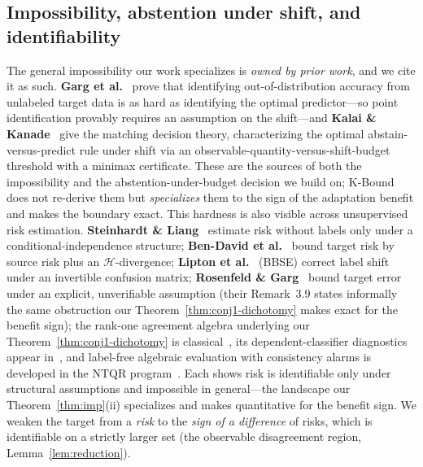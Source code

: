 \documentclass[conference]{IEEEtran}
\theoremstyle{plain}
\theoremstyle{definition}
\begin{document}
\subsection{Impossibility, abstention under shift, and identifiability}
The general impossibility our work specializes is \emph{owned by prior work}, and we cite it as
such. \textbf{Garg et al.}~\cite{garg2022atc} prove that identifying out-of-distribution accuracy
from unlabeled target data is as hard as identifying the optimal predictor---so point
identification provably requires an assumption on the shift---and \textbf{Kalai \&
Kanade}~\cite{kalai2021abstain} give the matching decision theory, characterizing the optimal
abstain-versus-predict rule under shift via an observable-quantity-versus-shift-budget threshold
with a minimax certificate. These are the sources of both the impossibility and the
abstention-under-budget decision we build on; K-Bound does not re-derive them but
\emph{specializes} them to the sign of the adaptation benefit and makes the boundary exact.
This hardness is also visible across unsupervised risk estimation.
\textbf{Steinhardt \& Liang}~\cite{steinhardt2016} estimate risk without labels only under a conditional-independence
structure; \textbf{Ben-David et al.}~\cite{bendavid2010theory,bendavid2010impossibility} bound target risk by source risk plus an
$\mathcal{H}$-divergence; \textbf{Lipton et al.}~\cite{lipton2018bbse} (BBSE) correct label shift under an invertible
confusion matrix; \textbf{Rosenfeld \& Garg}~\cite{rosenfeld2023dis2} bound target error under an explicit,
unverifiable assumption (their Remark~3.9 states informally the same obstruction our
Theorem~\ref{thm:conj1-dichotomy} makes exact for the benefit sign); the rank-one agreement algebra underlying our
Theorem~\ref{thm:conj1-dichotomy} is classical~\cite{parisi2014,jaffe2015,platanios2014,ibrahim2019},
its dependent-classifier diagnostics appear in~\cite{jaffe2016}, and label-free
algebraic evaluation with consistency alarms is developed in the NTQR
program~\cite{corradaemmanuel2024}. Each shows risk is identifiable only under structural assumptions and
impossible in general---the landscape our Theorem~\ref{thm:imp}(ii) specializes and makes
quantitative for the benefit sign. We weaken the target from a \emph{risk} to the \emph{sign of a difference} of
risks, which is identifiable on a strictly larger set (the observable disagreement region,
Lemma~\ref{lem:reduction}).
\end{document}
